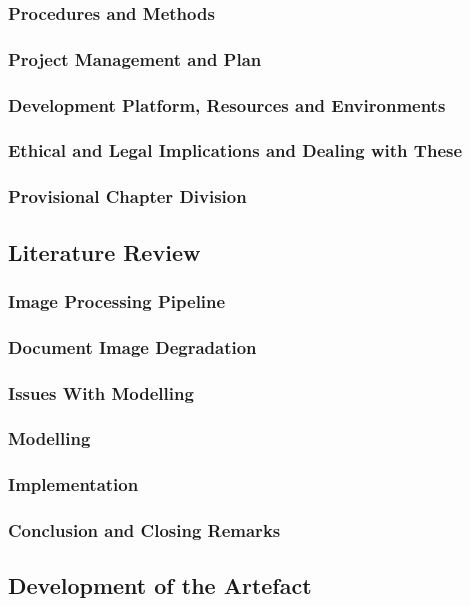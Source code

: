 \documentclass[a4paper, 12pt]{report}
\begin{document}
\subsubsection{Procedures and Methods}
\subsubsection{Project Management and Plan}
\subsubsection{Development Platform, Resources and Environments}
\subsubsection{Ethical and Legal Implications and Dealing with These}
\subsubsection{Provisional Chapter Division}
\subsection{Literature Review}
\subsubsection{Image Processing Pipeline}
\subsubsection{Document Image Degradation}
\subsubsection{Issues With Modelling}
\subsubsection{Modelling}
\subsubsection{Implementation}
\subsubsection{Conclusion and Closing Remarks}
\subsection{Development of the Artefact}
\end{document}

